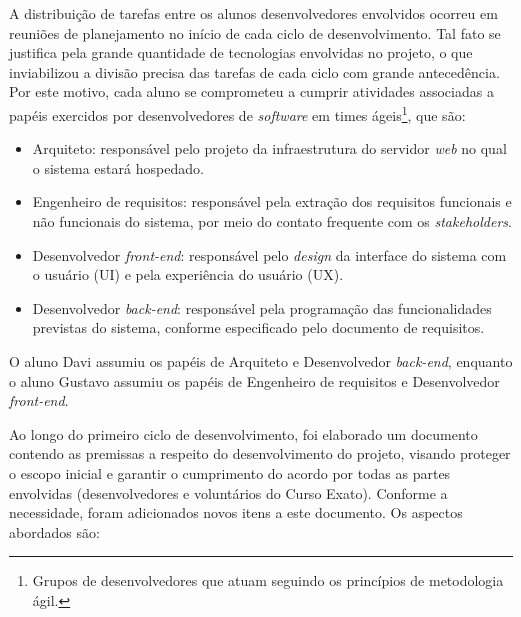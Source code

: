 \documentclass[a4paper]{article}
\begin{document}
A distribuição de tarefas entre os alunos desenvolvedores envolvidos ocorreu em reuniões de planejamento no início de cada ciclo de desenvolvimento. Tal fato se justifica pela grande quantidade de tecnologias envolvidas no projeto, o que inviabilizou a divisão precisa das tarefas de cada ciclo com grande antecedência. Por este motivo, cada aluno se comprometeu a cumprir atividades associadas a papéis exercidos por desenvolvedores de \textit{software} em times ágeis\footnote{Grupos de desenvolvedores que atuam seguindo os princípios de metodologia ágil.}, que são:
\begin{itemize}
\item Arquiteto: responsável pelo projeto da infraestrutura do servidor \textit{web} no qual o sistema estará hospedado.
\item Engenheiro de requisitos: responsável pela extração dos requisitos funcionais e não funcionais do sistema, por meio do contato frequente com os \textit{stakeholders}.
\item Desenvolvedor \textit{front-end}: responsável pelo \textit{design} da interface do sistema com o usuário (UI) e pela experiência do usuário (UX).
\item Desenvolvedor \textit{back-end}: responsável pela programação das funcionalidades previstas do sistema, conforme especificado pelo documento de requisitos.
\end{itemize}

O aluno Davi assumiu os papéis de Arquiteto e Desenvolvedor \textit{back-end}, enquanto o aluno Gustavo assumiu os papéis de Engenheiro de requisitos e Desenvolvedor \textit{front-end}.

Ao longo do primeiro ciclo de desenvolvimento, foi elaborado um documento contendo as premissas a respeito do desenvolvimento do projeto, visando proteger o escopo inicial e garantir o cumprimento do acordo por todas as partes envolvidas (desenvolvedores e voluntários do Curso Exato). Conforme a necessidade, foram adicionados novos itens a este documento. Os aspectos abordados são:
\end{document}
